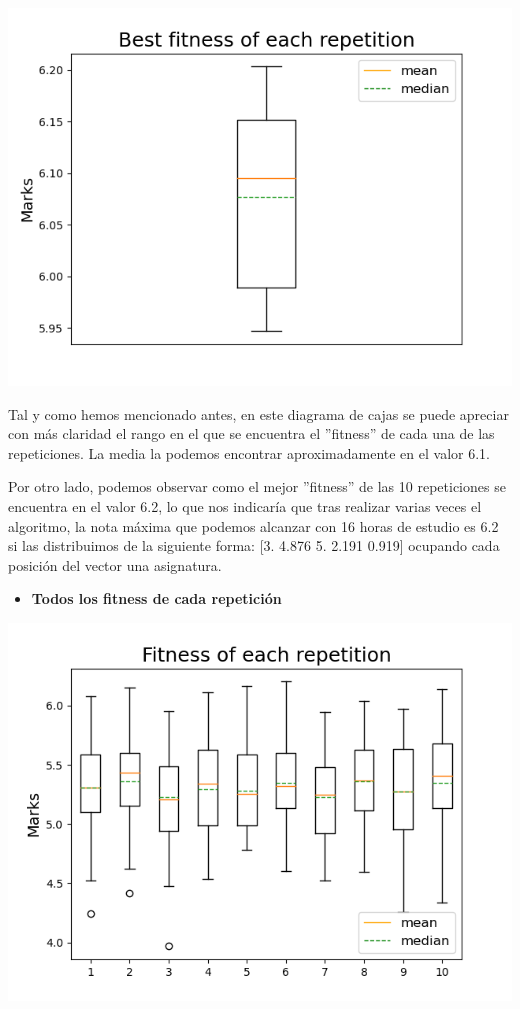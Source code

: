 \documentclass[11pt, a4paper, titlepage]{article}
\begin{document}
\includegraphics[scale=0.6]{img/grafica1_horsuf}

\vspace{5mm}

Tal y como hemos mencionado antes, en este diagrama de cajas se puede apreciar con más claridad el rango en el que se encuentra el ''fitness'' de cada una de las repeticiones. La media la podemos encontrar aproximadamente en el valor 6.1.

\vspace{5mm}

Por otro lado, podemos observar como el mejor ''fitness'' de las 10 repeticiones se encuentra en el valor 6.2, lo que nos indicaría que tras realizar varias veces el algoritmo, la nota máxima que podemos alcanzar con 16 horas de estudio es 6.2 si las distribuimos de la siguiente forma: [3.    4.876 5.    2.191 0.919] ocupando cada posición del vector una asignatura.

\newpage

\begin{itemize}
\item \textbf{Todos los fitness de cada repetición}
\end{itemize}

\includegraphics[scale=0.6]{img/grafica2_horsuf}
\end{document}
